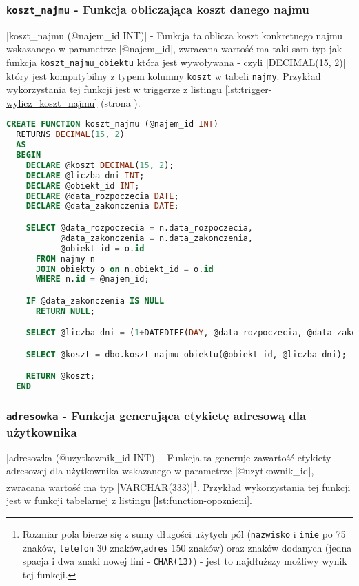 \subsubsection{\texttt{koszt\_najmu} - Funkcja obliczająca koszt danego najmu}

|koszt_najmu (@najem_id INT)| - Funkcja ta oblicza koszt konkretnego najmu wskazanego w parametrze |@najem_id|, zwracana wartość ma taki sam typ jak funkcja \texttt{koszt\_najmu\_obiektu} która jest wywoływana - czyli |DECIMAL(15, 2)| który jest kompatybilny z typem kolumny \texttt{koszt} w tabeli \texttt{najmy}. Przykład wykorzystania tej funkcji jest w triggerze z listingu \ref{lst:trigger-wylicz_koszt_najmu} (strona \pageref{lst:trigger-wylicz_koszt_najmu}).

\begin{lstlisting}[language=SQL, caption={Skrypt tworzący funkcję skalarną \texttt{koszt\_najmu}}, label={lst:function-koszt_najmu}]
CREATE FUNCTION koszt_najmu (@najem_id INT)
  RETURNS DECIMAL(15, 2)
  AS
  BEGIN
    DECLARE @koszt DECIMAL(15, 2);
    DECLARE @liczba_dni INT;
    DECLARE @obiekt_id INT;
    DECLARE @data_rozpoczecia DATE;
    DECLARE @data_zakonczenia DATE;

    SELECT @data_rozpoczecia = n.data_rozpoczecia,
           @data_zakonczenia = n.data_zakonczenia,
           @obiekt_id = o.id
      FROM najmy n
      JOIN obiekty o on n.obiekt_id = o.id
      WHERE n.id = @najem_id;

    IF @data_zakonczenia IS NULL
      RETURN NULL;

    SELECT @liczba_dni = (1+DATEDIFF(DAY, @data_rozpoczecia, @data_zakonczenia));

    SELECT @koszt = dbo.koszt_najmu_obiektu(@obiekt_id, @liczba_dni);

    RETURN @koszt;
  END
\end{lstlisting}

\subsubsection{\texttt{adresowka} - Funkcja generująca etykietę adresową dla użytkownika}

|adresowka (@uzytkownik_id INT)| - Funkcja ta generuje zawartość etykiety adresowej dla użytkownika wskazanego w parametrze |@uzytkownik_id|, zwracana wartość ma typ |VARCHAR(333)|\footnote{Rozmiar pola bierze się z sumy długości użytych pól (\texttt{nazwisko} i \texttt{imie} po 75 znaków, \texttt{telefon} 30 znaków,\texttt{adres} 150 znaków) oraz znaków dodanych (jedna spacja i dwa znaki nowej lini - \texttt{CHAR(13)}) - jest to najdłuższy możliwy wynik tej funkcji.}. Przykład wykorzystania tej funkcji jest w funkcji tabelarnej z listingu \ref{lst:function-opoznieni}.

